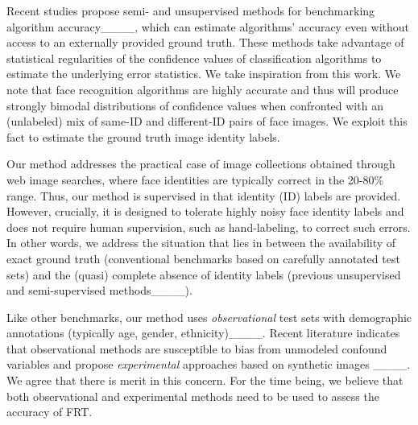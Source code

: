 Recent studies propose semi- and unsupervised methods for benchmarking algorithm accuracy____, which can estimate algorithms' accuracy even without access to an externally provided ground truth. These methods take advantage of statistical regularities of the confidence values of classification algorithms to estimate the underlying error statistics. We take inspiration from this work. We note that face recognition algorithms are highly accurate and thus will produce strongly bimodal distributions of confidence values when confronted with an (unlabeled) mix of same-ID and different-ID pairs of face images. We exploit this fact to estimate the ground truth image identity labels. 

Our method addresses the practical case of image collections obtained through web image searches, where face identities are typically correct in the 20-80\% range. Thus, our method is supervised in that identity (ID) labels are provided. However, crucially, it is designed to tolerate highly noisy face identity labels and does not require human supervision, such as hand-labeling, to correct such errors. In other words, we address the situation that lies in between the availability of exact ground truth (conventional benchmarks based on carefully annotated test sets) and the (quasi) complete absence of identity labels (previous unsupervised and semi-supervised methods____). 

 Like other benchmarks, our method uses {\em observational} test sets with demographic annotations (typically age, gender, ethnicity)____. Recent literature indicates that observational methods are susceptible to bias from unmodeled confound variables and propose {\em experimental} approaches based on synthetic images ____. We agree that there is merit in this concern. For the time being, we believe that both observational and experimental methods need to be used to assess the accuracy of FRT.